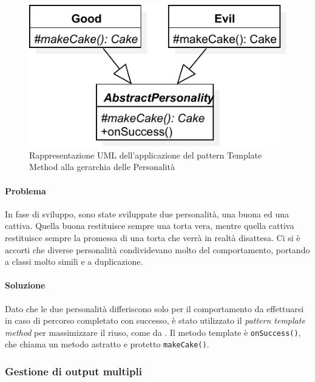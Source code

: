 \documentclass[a4paper,12pt]{report}
\begin{document}
\begin{figure}[H]
	\centering{}
	\includegraphics[width=\textwidth]{img/template}
	\caption{Rappresentazione UML dell'applicazione del pattern Template Method alla gerarchia delle Personalità}
	\label{img:template}
\end{figure}

\paragraph{Problema} In fase di sviluppo, sono state sviluppate due personalità, una buona ed una cattiva.
Quella buona restituisce sempre una torta vera, mentre quella cattiva restituisce sempre la
promessa di una torta che verrà in realtà disattesa.
Ci si è accorti che diverse personalità condividevano molto del comportamento,
portando a classi molto simili e a duplicazione.

\paragraph{Soluzione} Dato che le due personalità differiscono solo per il comportamento da effettuarsi in caso di percorso completato con successo,
è stato utilizzato il \textit{pattern template method} per massimizzare il riuso, come da .
Il metodo template è \texttt{onSuccess()}, che chiama un metodo astratto e protetto
\texttt{makeCake()}.

\subsubsection{Gestione di output multipli}
\end{document}
